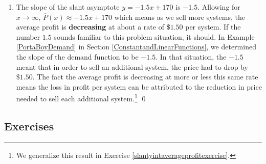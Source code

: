\begin{ex}
\begin{enumerate}
\begin{center}
\end{center}

\item The slope of the slant asymptote $y = -1.5x+170$ is $-1.5$.  Allowing for $x \rightarrow \infty$, $\overline{P}(x) \approx -1.5 x + 170$ which means as we sell more systems, the average profit is \textbf{decreasing} at about a rate of $\$ 1.50$ per system.  If the number $1.5$ sounds familiar to this problem situation, it should.  In Example \ref{PortaBoyDemand} in Section \ref{ConstantandLinearFunctions}, we determined the slope of the demand function to be $-1.5$. In that situation, the $-1.5$ meant that in order to sell an additional system, the price had to drop by $\$ 1.50$.  The fact the average profit is decreasing at more or less this same rate means the loss in profit per system can be attributed to the reduction in price needed to sell each additional system.\footnote{We generalize this result in Exercise \ref{slantyintaverageprofitexercise}.} \qed

\end{enumerate}


\end{ex}

\newpage

\subsection{Exercises}



\closegraphsfile